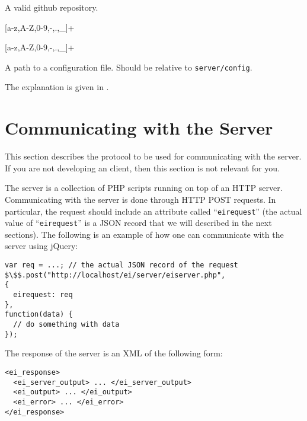 A valid github repository.

\bigskip
\noindent
{}

[a-z,A-Z,0-9,-,.,\_]+

\bigskip
\noindent
{}

[a-z,A-Z,0-9,-,.,\_]+

\bigskip
\noindent
{}

A path to a configuration file. Should be relative to
\texttt{server/config}.

\bigskip
\noindent
{}

The explanation is given in .

\section{Communicating with the \ei Server}
\label{ch:server:protocol}

This section describes the protocol to be used for communicating with
the \ei server. If you are not developing an \ei client, then this
section is not relevant for you.

The \ei server is a collection of PHP scripts running on top of an
HTTP server. Communicating with the server is done through HTTP POST
requests. 
%
In particular, the request should include an attribute called
``\texttt{eirequest}'' (the actual value of ``\texttt{eirequest}'' is
a JSON record that we will described in the next sections). The
following is an example of how one can communicate with the server
using jQuery:

\bigskip
\begin{lstlisting}
var req = ...; // the actual JSON record of the request
$\$$.post("http://localhost/ei/server/eiserver.php",
{
  eirequest: req
},
function(data) { 
  // do something with data
});
\end{lstlisting}

\bigskip
\noindent
The response of the server is an XML of the following form:

\bigskip
\begin{lstlisting}
<ei_response>
  <ei_server_output> ... </ei_server_output>
  <ei_output> ... </ei_output>
  <ei_error> ... </ei_error>
</ei_response>
\end{lstlisting}

